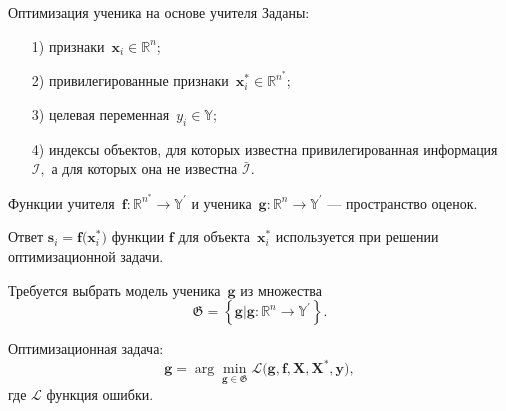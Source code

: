 \documentclass[10pt,pdf,hyperref={unicode}]{beamer}
\begin{document}
\begin{frame}{Оптимизация ученика на основе учителя}
\justifying
Заданы:
\begin{enumerate}
    \item[1)] признаки~$\mathbf{x}_i \in \mathbb{R}^{n}$;
    \item[2)] привилегированные признаки~$\mathbf{x}^*_i \in \mathbb{R}^{n^*}$;
    \item[3)] целевая переменная~$y_i \in \mathbb{Y}$;
    \item[4)] индексы объектов, для которых известна привилегированная информация $\mathcal{I},$ а для которых она не известна $\bar{\mathcal{I}}$.
\end{enumerate}

\bigskip

Функции учителя~$\mathbf{f}:\mathbb{R}^{n^*} \to \mathbb{Y}^\prime$ и ученика~$\mathbf{g}:\mathbb{R}^{n} \to \mathbb{Y}^\prime$ --- пространство оценок.

Ответ $\mathbf{s}_i = \mathbf{f}\bigr(\mathbf{x}_i^*\bigr)$ функции $\mathbf{f}$ для объекта~$\mathbf{x}^*_i$ используется при решении оптимизационной задачи.

\bigskip

Требуется выбрать модель ученика~$\mathbf{g}$ из множества
\[
	\mathfrak{G} = \left\{\mathbf{g}| \mathbf{g}:\mathbb{R}^{n} \to \mathbb{Y}^\prime\right\}.
\]

Оптимизационная задача:
\[
	\mathbf{g} = \arg\min_{\mathbf{g} \in \mathfrak{G}} \mathcal{L}\bigr(\mathbf{g}, \mathbf{f}, \mathbf{X}, \mathbf{X}^{*}, \mathbf{y}\bigr),
\]
где $\mathcal{L}$ функция ошибки.
\end{frame}
\end{document}
